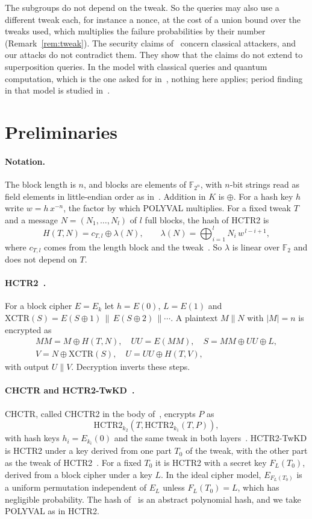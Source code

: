\documentclass[11pt]{article}
\theoremstyle{definition}
\theoremstyle{remark}
\newcommand{\F}{\mathbb{F}}
\newcommand{\XCTR}{\mathrm{XCTR}}
\begin{document}
The subgroups do not depend on the tweak. So the queries may also use a different tweak each, for instance a nonce, at the cost of a union bound over the tweaks used, which multiplies the failure probabilities by their number (Remark~\ref{rem:tweak}). The security claims of~\cite{CHB21,CHMNSS26,OKY26} concern classical attackers, and our attacks do not contradict them. They show that the claims do not extend to superposition queries. In the model with classical queries and quantum computation, which is the one asked for in~\cite{NIST25}, nothing here applies; period finding in that model is studied in~\cite{BHNSS19}.

\section{Preliminaries}\label{sec:prelim}

\paragraph{Notation.} The block length is $n$, and blocks are elements of $\F_{2^n}$, with $n$-bit strings read as field elements in little-endian order as in~\cite{CHB21}. Addition in $K$ is $\oplus$. For a hash key $h$ write $w=h\,x^{-n}$, the factor by which POLYVAL multiplies. For a fixed tweak $T$ and a message $N=(N_1,\dots,N_l)$ of $l$ full blocks, the hash of HCTR2 is
\[
H(T,N)=c_{T,l}\oplus\lambda(N),\qquad \lambda(N)=\bigoplus_{i=1}^{l} N_i\,w^{\,l-i+1},
\]
where $c_{T,l}$ comes from the length block and the tweak~\cite[Section 3]{CHB21}. So $\lambda$ is linear over $\F_2$ and does not depend on $T$.

\paragraph{HCTR2~\cite{CHB21}.} For a block cipher $E=E_k$ let $h=E(0)$, $L=E(1)$ and $\XCTR(S)=E(S\oplus1)\,\|\,E(S\oplus2)\,\|\cdots$. A plaintext $M\|N$ with $|M|=n$ is encrypted as
\begin{gather*}
MM=M\oplus H(T,N),\quad UU=E(MM),\quad S=MM\oplus UU\oplus L,\\
V=N\oplus\XCTR(S),\quad U=UU\oplus H(T,V),
\end{gather*}
with output $U\|V$. Decryption inverts these steps.

\paragraph{CHCTR and HCTR2-TwKD~\cite{CHMNSS26}.} CHCTR, called CHCTR2 in the body of~\cite{CHMNSS26}, encrypts $P$ as \[\mathrm{HCTR2}_{k_2}(T,\mathrm{HCTR2}_{k_1}(T,P)),\] with hash keys $h_i=E_{k_i}(0)$ and the same tweak in both layers~\cite[Section 3.3]{CHMNSS26}. HCTR2-TwKD is HCTR2 under a key derived from one part $T_0$ of the tweak, with the other part as the tweak of HCTR2~\cite[Section 3.4]{CHMNSS26}. For a fixed $T_0$ it is HCTR2 with a secret key $F_L(T_0)$, derived from a block cipher under a key $L$. In the ideal cipher model, $E_{F_L(T_0)}$ is a uniform permutation independent of $E_L$ unless $F_L(T_0)=L$, which has negligible probability. The hash of~\cite{CHMNSS26} is an abstract polynomial hash, and we take POLYVAL as in HCTR2.
\end{document}
